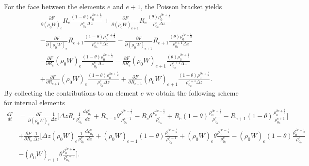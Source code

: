 \documentclass[a4paper,11pt]{article}
\begin{document}
For the face between the elements  $e$ and  $e+1$, the Poisson bracket yields
\begin{equation}
\begin{aligned}
\frac{\partial F}{\partial (\rho_0 W)_{e}}R_{e}\frac{(1-\theta)\rho_0^{\partial e +\frac{1}{2}}}{\rho_{0{{}_h}}^{e}\Delta z}+ \frac{\partial F}{\partial (\rho_0 W)_{e+1}}R_{e} \frac{(\theta)\rho_0^{\partial e +\frac{1}{2}}}{\rho_{0{{}_h}}^{e}\Delta z}\\ - \frac{\partial F}{\partial (\rho_0 W)_{e}}R_{e+1}\frac{(1-\theta)\rho_0^{\partial e +\frac{1}{2}}}{\rho_{0{{}_h}}^{e+1}\Delta z}  -\frac{\partial F}{\partial (\rho_0 W)_{e+1}}R_{e+1}\frac{(\theta)\rho_0^{\partial e +\frac{1}{2}}}{\rho_{0{{}_h}}^{e+1}\Delta z}\\
-\frac{\partial F}{\partial R_{e}}(\rho_0 W)_{e}\frac{(1-\theta)\rho_0^{\partial e +\frac{1}{2}}}{\rho_{0{{}_h}}^{e}\Delta z}  -\frac{\partial F}{\partial R_{e}}(\rho_0 W)_{e+1} \frac{(\theta)\rho_0^{\partial e +\frac{1}{2}}}{\rho_{0{{}_h}}^{e+1}\Delta z}\\+\frac{\partial F}{\partial R_{e+1}}(\rho_0 W)_{e}\frac{(1-\theta)\rho_0^{\partial e +\frac{1}{2}}}{\rho_{0{{}_h}}^{e}\Delta z}  +\frac{\partial F}{\partial R_{e+1}}(\rho_0 W)_{e+1} \frac{(1-\theta)\rho_0^{\partial e +\frac{1}{2}}}{\rho_{0{{}_h}}^{e+1}\Delta z}.
\end{aligned}
\end{equation}
By collecting the contributions to an element $e$ we obtain the following scheme for internal elements
\begin{equation}
\begin{aligned}
\frac{d F}{d t} & =\frac{\partial F}{\partial (\rho_0 W)_{e}}\frac{1}{\Delta z}\bigg [ \Delta z R_e \frac{1}{\rho^e_{0{{}_h}}} \frac{d\rho^e_{0{{}_h}}}{dz}  + R_{e-1} \theta \frac{\rho_0^{\partial e - \frac{1}{2}}}{\rho_{0{{}_h}}^{e-1}} - R_{e} \theta\frac{\rho_0^{\partial e - \frac{1}{2}}}{\rho_{0{{}_h}}^{e}}+ R_{e}(1-\theta)\frac{\rho_0^{\partial e + \frac{1}{2}}}{\rho_{0{{}_h}}^{e}} - R_{e+1}(1-\theta)   \frac{\rho_0^{\partial e + \frac{1}{2}}}{\rho_{0{{}_h}}^{e+1}}                      \bigg]\\
&+\frac{\partial F}{\partial R_{e}}\frac{1}{\Delta z}\bigg [ \Delta z (\rho_0 W)_e \frac{1}{\rho^e_{0{{}_h}}} \frac{d\rho^e_{0{{}_h}}}{dz} +   (\rho_0 W)_{e-1}(1-\theta)\frac{\rho_0^{\partial e - \frac{1}{2}}}{\rho_{0{{}_h}}^{e-1}}  + (\rho_0 W)_{e} \theta\frac{\rho_0^{\partial e - \frac{1}{2}}}{\rho_{0{{}_h}}^{e}}  - (\rho_0 W)_{e}(1-\theta)\frac{\rho_0^{\partial e + \frac{1}{2}}}{\rho_{0{{}_h}}^{e}}   \\ &- (\rho_0 W)_{e+1}\theta \frac{\rho_0^{\partial e + \frac{1}{2}}}{\rho_{0{{}_h}}^{e+1}}       \bigg].
\end{aligned}
\end{equation}
\end{document}

